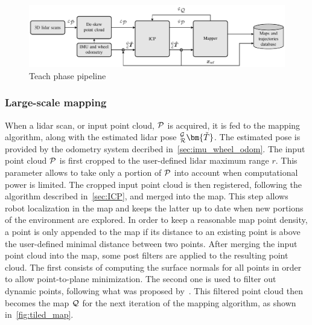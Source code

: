 \begin{figure} [htpb]
	\centering
	\includegraphics[width=\linewidth]{figs/Teach_pipeline/teach_pipeline.pdf}
	\caption{Teach phase pipeline}
	\label{fig:teach_pipeline}
\end{figure}

\subsubsection{Large-scale mapping}
\label{sec:tiled_map}


When a lidar scan, or input point cloud, $\mathcal{P}$ is acquired, it is fed to the mapping algorithm, along with the estimated lidar pose $_{\robotf}^{\mapf}\bm{\check{T}}$. %
The estimated pose is provided by the odometry system decribed in~\autoref{sec:imu_wheel_odom}.
The input point cloud  $\mathcal{P}$ is first cropped to the user-defined lidar maximum range $r$. %
This parameter allows to take only a portion of $\mathcal{P}$ into account when computational power is limited.
The cropped input point cloud is then registered, following the algorithm described in~\autoref{sec:ICP}, and merged into the map.
This step allows robot localization in the map and keeps the latter up to date when new portions of the environment are explored.
In order to keep a reasonable map point density, a point is only appended to the map if its distance to an existing point is above the user-defined minimal distance between two points.
After merging the input point cloud into the map, some post filters are applied to the resulting point cloud.
The first consists of computing the surface normals for all points in order to allow point-to-plane minimization.
The second one is used to filter out dynamic points, following what was proposed by~\citet{Pomerleau2014}.
This filtered point cloud then becomes the map $\mathcal{Q}$ for the next iteration of the mapping algorithm, as shown in~\autoref{fig:tiled_map}.

